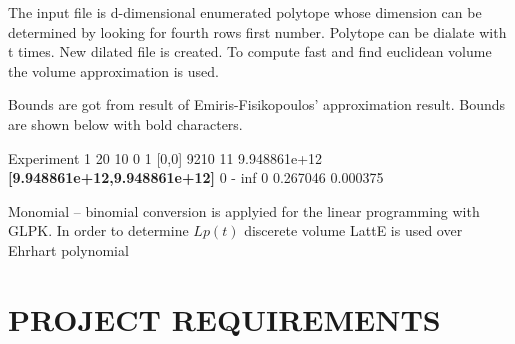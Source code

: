 \documentclass[12pt,twoside]{article}
\begin{document}
\par
The input file is d-dimensional enumerated polytope whose dimension can be
determined by looking for fourth rows first number. Polytope can be dialate with t
times. New dilated file is created. To compute fast and find euclidean volume the
volume approximation is used.\newline
\par
Bounds are got from result of Emiris-Fisikopoulos' approximation result.
Bounds are shown below with bold characters.\newline
\par 
Experiment 1  20 10 0 1 [0,0] 9210 11 9.948861e+12 \textbf{ [9.948861e+12,9.948861e+12]} 0 - inf 0 0.267046 0.000375
\newline
\par
Monomial – binomial conversion is applyied for the linear programming
with GLPK. In order to determine $Lp(t)$ discerete volume LattE is used over Ehrhart polynomial
\section{PROJECT REQUIREMENTS}
\end{document}

